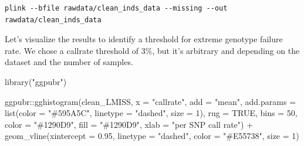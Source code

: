 \documentclass[
]{book}
\newenvironment{Shaded}{\begin{snugshade}}{\end{snugshade}}
\newcommand{\AttributeTok}[1]{\textcolor[rgb]{0.77,0.63,0.00}{#1}}
\newcommand{\CommentTok}[1]{\textcolor[rgb]{0.56,0.35,0.01}{\textit{#1}}}
\newcommand{\ConstantTok}[1]{\textcolor[rgb]{0.00,0.00,0.00}{#1}}
\newcommand{\DecValTok}[1]{\textcolor[rgb]{0.00,0.00,0.81}{#1}}
\newcommand{\FloatTok}[1]{\textcolor[rgb]{0.00,0.00,0.81}{#1}}
\newcommand{\FunctionTok}[1]{\textcolor[rgb]{0.00,0.00,0.00}{#1}}
\newcommand{\NormalTok}[1]{#1}
\newcommand{\OtherTok}[1]{\textcolor[rgb]{0.56,0.35,0.01}{#1}}
\newcommand{\SpecialCharTok}[1]{\textcolor[rgb]{0.00,0.00,0.00}{#1}}
\newcommand{\StringTok}[1]{\textcolor[rgb]{0.31,0.60,0.02}{#1}}
\begin{document}
\begin{verbatim}
plink --bfile rawdata/clean_inds_data --missing --out rawdata/clean_inds_data
\end{verbatim}

Let's visualize the results to identify a threshold for extreme genotype failure rate. We chose a callrate threshold of 3\%, but it's arbitrary and depending on the dataset and the number of samples.

\begin{Shaded}
\end{Shaded}

\begin{Shaded}
\begin{Highlighting}[]
\FunctionTok{library}\NormalTok{(}\StringTok{"ggpubr"}\NormalTok{)}

\NormalTok{ggpubr}\SpecialCharTok{::}\FunctionTok{gghistogram}\NormalTok{(clean\_LMISS, }\AttributeTok{x =} \StringTok{"callrate"}\NormalTok{,}
                    \AttributeTok{add =} \StringTok{"mean"}\NormalTok{, }\AttributeTok{add.params =} \FunctionTok{list}\NormalTok{(}\AttributeTok{color =} \StringTok{"\#595A5C"}\NormalTok{, }\AttributeTok{linetype =} \StringTok{"dashed"}\NormalTok{, }\AttributeTok{size =} \DecValTok{1}\NormalTok{),}
                    \AttributeTok{rug =} \ConstantTok{TRUE}\NormalTok{, }\AttributeTok{bins =} \DecValTok{50}\NormalTok{,}
                    \AttributeTok{color =} \StringTok{"\#1290D9"}\NormalTok{, }\AttributeTok{fill =} \StringTok{"\#1290D9"}\NormalTok{,}
                    \AttributeTok{xlab =} \StringTok{"per SNP call rate"}\NormalTok{) }\SpecialCharTok{+}
  \FunctionTok{geom\_vline}\NormalTok{(}\AttributeTok{xintercept =} \FloatTok{0.95}\NormalTok{, }\AttributeTok{linetype =} \StringTok{"dashed"}\NormalTok{,}
                \AttributeTok{color =} \StringTok{"\#E55738"}\NormalTok{, }\AttributeTok{size =} \DecValTok{1}\NormalTok{)}
\end{Highlighting}
\end{Shaded}
\end{document}
